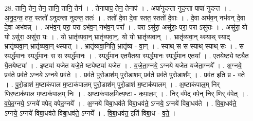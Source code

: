 \documentclass[17pt]{extarticle}
\begin{document}
28. तानि॒ तेन॒ तेन॒ तानि॒ तानि॒ तेन॑ । . तेनापाप॒ तेन॒ तेनाप॑ । . अपा॑नुदन्ता नुद॒न्ता पापा॑ नुदन्त । . अ॒नु॒द॒न्त॒ तत॒ स्ततो॑ ऽनुदन्ता नुदन्त॒ ततः॑ । . ततो॑ दे॒वा दे॒वा स्तत॒ स्ततो॑ दे॒वाः । . दे॒वा अभ॑व॒न् नभ॑वन् दे॒वा दे॒वा अभ॑वन्न् । . अभ॑व॒न् परा॒ परा ऽभ॑व॒न् नभ॑व॒न् परा᳚ । . परा ऽसु॑रा॒ असु॑राः॒ परा॒ परा ऽसु॑राः । . असु॑रा॒ यो यो ऽसु॑रा॒ असु॑रा॒ यः । . यो भ्रातृ॑व्यवा॒न् भ्रातृ॑व्यवा॒न्॒. यो यो भ्रातृ॑व्यवान् । . भ्रातृ॑व्यवा॒न् थ्स्याथ् स्याद् भ्रातृ॑व्यवा॒न् भ्रातृ॑व्यवा॒न् थ्स्यात् । . भ्रातृ॑व्यवा॒निति॒ भ्रातृ॑व्य - वा॒न् । . स्याथ् स स स्याथ् स्याथ् सः । . स स्पर्द्ध॑मानः॒ स्पर्द्ध॑मानः॒ स स स्पर्द्ध॑मानः । . स्पर्द्ध॑मान ए॒तयै॒तया॒ स्पर्द्ध॑मानः॒ स्पर्द्ध॑मान ए॒तया᳚ । . ए॒तयेष्ट्ये ष्ट्यै॒त यै॒तयेष्ट्या᳚ । . इष्ट्या॑ यजेत यजे॒ते ष्ट्येष्ट्या॑ यजेत । . य॒जे॒ता॒ग्नये॒ ऽग्नये॑ यजेत यजेता॒ग्नये᳚ । . अ॒ग्नये॒ प्रव॑ते॒ प्रव॑ते॒ ऽग्नये॒ ऽग्नये॒ प्रव॑ते । . प्रव॑ते पुरो॒डाश॑म् पुरो॒डाश॒म् प्रव॑ते॒ प्रव॑ते पुरो॒डाश᳚म् । . प्रव॑त॒ इति॒ प्र - व॒ते॒ । . पु॒रो॒डाश॑ म॒ष्टाक॑पाल म॒ष्टाक॑पालम् पुरो॒डाश॑म् पुरो॒डाश॑ म॒ष्टाक॑पालम् । . अ॒ष्टाक॑पाल॒म् निर् णिर॒ष्टाक॑पाल म॒ष्टाक॑पाल॒म् निः । . अ॒ष्टाक॑पाल॒मित्य॒ष्टा - क॒पा॒ल॒म् । . निर् व॑पेद् वपे॒न् निर् णिर् व॑पेत् । . व॒पे॒द॒ग्नये॒ ऽग्नये॑ वपेद् वपेद॒ग्नये᳚ । . अ॒ग्नये॑ विबा॒धव॑ते विबा॒धव॑ते॒ ऽग्नये॒ ऽग्नये॑ विबा॒धव॑ते । . वि॒बा॒धव॑ते॒ ऽग्नये॒ ऽग्नये॑ विबा॒धव॑ते विबा॒धव॑ते॒ ऽग्नये᳚ । . वि॒बा॒धव॑त॒ इति॑ विबा॒ध - व॒ते॒ । \newline
\end{document}
